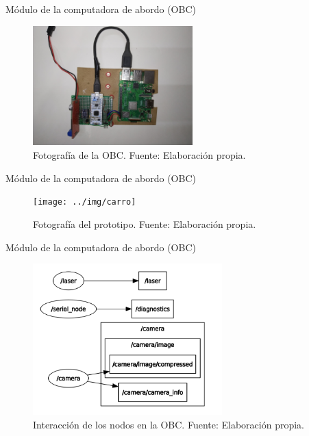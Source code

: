 \documentclass[10pt]{beamer}
\begin{document}
\begin{frame}{Módulo de la computadora de abordo (OBC)}
    \begin{figure}[!h] 
        \centering
        \includegraphics[width=0.55\textwidth]{../img/obc}
        \caption[Fotografía de la OBC]{Fotografía de la OBC. Fuente: Elaboración propia. }
    \end{figure}
\end{frame}

\begin{frame}{Módulo de la computadora de abordo (OBC)}
    \begin{figure}[!h] 
        \centering
        \texttt{[image: ../img/carro]}
        \caption[Fotografía del prototipo]{Fotografía del prototipo. Fuente: Elaboración propia. }
        \end{figure}
\end{frame}

\begin{frame}{Módulo de la computadora de abordo (OBC)}
    \begin{figure}[!h] 
        \centering
        \includegraphics[width=0.65\textwidth]{../img/nodosobc}
        \caption[Interacción de los nodos en la OBC]{Interacción de los nodos en la OBC. Fuente: Elaboración propia. }
    
    \end{figure}
\end{frame}
\end{document}
